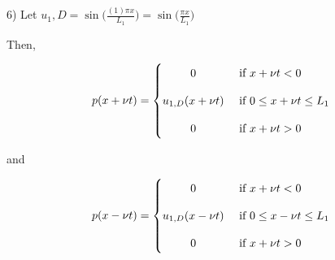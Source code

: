 \documentclass[executivepaper]{article}
\begin{document}
\begin{flushleft}

6) Let $u_{1},{D}=\sin\bigg(\frac{(1)\pi x}{L_{1}}\bigg)=\sin\bigg(\frac{\pi x}{L_{1}}\bigg)$

\vspace{2mm}

Then,

\pagebreak

\vspace*{-40mm}

\begin{center}

\[
 p(x+\nu t)=
  \begin{cases}
      \hfill 0    \hfill & \text{ if $x+\nu t < 0$} \\[1em]
      
      \hfill u_{1,D}(x+\nu t) \hfill & \text{ if $0 \leq x+\nu t \leq L_{1}$} \\[1em]
      
      \hfill 0 \hfill & \text{ if $x+\nu t > 0$}
  \end{cases}
\]

\end{center} 

and 

\begin{center}

\[
 p(x-\nu t)=
  \begin{cases}
      \hfill 0    \hfill & \text{ if $x+\nu t < 0$} \\[1em]
      
      \hfill u_{1,D}(x-\nu t) \hfill & \text{ if $0 \leq x-\nu t \leq L_{1}$} \\[1em]
      
      \hfill 0 \hfill & \text{ if $x+\nu t > 0$}
  \end{cases}
\]

\end{center}

\end{flushleft}
\end{document}
